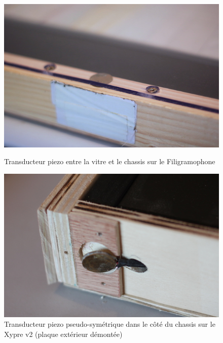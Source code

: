 \begin{figure}[!htbp]
	\captionsetup{format=plain}%
	\centering
	\begin{minipage}[t]{0.48\textwidth}
		\includegraphics[width=\linewidth]{gfx/05_interfaces/filigramophone-piezo_72dpi.jpg}
		\caption{Transducteur piezo entre la vitre et le chassis sur le Filigramophone}
		\label{fig:interface:filigramophone-piezo}
	\end{minipage}
	\hspace{.02\linewidth}
	\begin{minipage}[t]{0.48\textwidth}
	    \includegraphics[width=\linewidth]{gfx/05_interfaces/xypre-piezo_72dpi.jpg}
		\caption{Transducteur piezo pseudo-symétrique dans le côté du chassis sur le Xypre v2 (plaque extérieur démontée)}
		\label{fig:interface:xypre_v2-piezo1}
	\end{minipage}
\end{figure}
